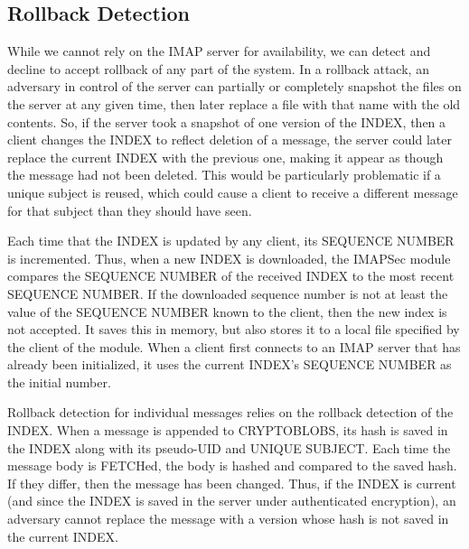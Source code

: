 \documentclass[pageno]{jpaper}
\newcommand{\project}{IMAPSec }
\begin{document}
\subsection{Rollback Detection}
\label{rollback}

While we cannot rely on the IMAP server for availability, we can detect and decline to accept rollback of any part of the system. In a rollback attack, an adversary in control of the server can partially or completely snapshot the files on the server at any given time, then later replace a file with that name with the old contents. So, if the server took a snapshot of one version of the INDEX, then a client changes the INDEX to reflect deletion of a message, the server could later replace the current INDEX with the previous one, making it appear as though the message had not been deleted. This would be particularly problematic if a unique subject is reused, which could cause a client to receive a different message for that subject than they should have seen.

 Each time that the INDEX is updated by any client, its SEQUENCE NUMBER is incremented. Thus, when a new INDEX is downloaded, the \project module compares the SEQUENCE NUMBER of the received INDEX to the most recent SEQUENCE NUMBER. If the downloaded sequence number is not at least the value of the SEQUENCE NUMBER known to the client, then the new index is not accepted. It saves this in memory, but also stores it to a local file specified by the client of the module. When a client first connects to an IMAP server that has already been initialized, it uses the current INDEX's SEQUENCE NUMBER as the initial number.

Rollback detection for individual messages relies on the rollback detection of the INDEX. When a message is appended to CRYPTOBLOBS, its hash is saved in the INDEX along with its pseudo-UID and UNIQUE SUBJECT. Each time the message body is FETCHed, the body is hashed and compared to the saved hash. If they differ, then the message has been changed. Thus, if the INDEX is current (and since the INDEX is saved in the server under authenticated encryption), an adversary cannot replace the message with a version whose hash is not saved in the current INDEX.
\end{document}
